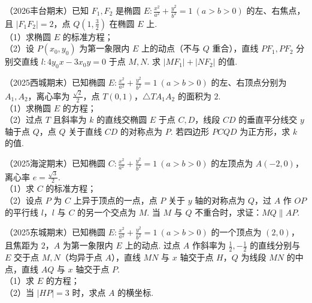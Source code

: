 \begin{example} %
（2026丰台期末）已知 $F_1,F_2$ 是椭圆 $E:\frac{x^2}{a^2}+\frac{y^2}{b^2}=1\ (a>b>0)$ 的左、右焦点，且 $\lvert F_1F_2\rvert=2$，点 $Q\left(1,\frac{3}{2}\right)$ 在椭圆 $E$ 上.\\
（1）求椭圆 $E$ 的标准方程；\\
（2）设 $P(x_0,y_0)$ 为第一象限内 $E$ 上的动点（不与 $Q$ 重合），直线 $PF_1,PF_2$ 分别交直线 $l:4y_0x-3x_0y=0$ 于点 $M,N$. 求 $\lvert MF_1\rvert+\lvert NF_2\rvert$ 的值.
\end{example}

\begin{example} %
（2025西城期末）已知椭圆 $E:\frac{x^2}{a^2}+\frac{y^2}{b^2}=1\ (a>b>0)$ 的左、右顶点分别为 $A_1,A_2$，离心率为 $\frac{\sqrt{2}}{2}$，点 $T(0,1)$，$\triangle TA_1A_2$ 的面积为 $2$.\\
（1）求椭圆 $E$ 的方程；\\
（2）过点 $T$ 且斜率为 $k$ 的直线交椭圆 $E$ 于点 $C,D$，线段 $CD$ 的垂直平分线交 $y$ 轴于点 $Q$，点 $Q$ 关于直线 $CD$ 的对称点为 $P$. 若四边形 $PCQD$ 为正方形，求 $k$ 的值.
\end{example}

\begin{example} %
（2025海淀期末）已知椭圆 $C:\frac{x^2}{a^2}+\frac{y^2}{b^2}=1\ (a>b>0)$ 的左顶点为 $A(-2,0)$，离心率 $e=\frac{\sqrt{3}}{2}$.\\
（1）求 $C$ 的标准方程；\\
（2）设点 $P$ 为 $C$ 上异于顶点的一点，点 $P$ 关于 $y$ 轴的对称点为 $Q$，过 $A$ 作 $OP$ 的平行线 $l$，$l$ 与 $C$ 的另一个交点为 $M$. 当 $M$ 与 $Q$ 不重合时，求证：$MQ\parallel AP$.
\end{example}

\begin{example} %
（2025东城期末）已知椭圆 $E:\frac{x^2}{a^2}+\frac{y^2}{b^2}=1\ (a>b>0)$ 的一个顶点为 $(2,0)$，且焦距为 $2$，$A$ 为第一象限内 $E$ 上的动点. 过点 $A$ 作斜率为 $\frac{1}{2},-\frac{1}{2}$ 的直线分别与 $E$ 交于点 $M,N$（均异于点 $A$），直线 $MN$ 与 $x$ 轴交于点 $H$，$Q$ 为线段 $MN$ 的中点，直线 $AQ$ 与 $x$ 轴交于点 $P$.\\
（1）求 $E$ 的方程；\\
（2）当 $\lvert HP\rvert=3$ 时，求点 $A$ 的横坐标.
\end{example}

